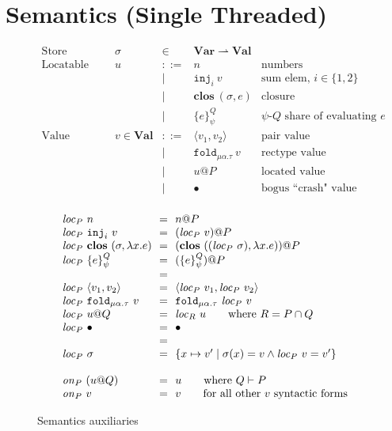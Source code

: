 \documentclass[10pt]{article}
\makeatletter
\newcommand{\kw}[1]{\ensuremath{\mathtt{#1}}}
\newcommand{\trec}[2]{\ensuremath{\mu {#1}.{#2}}}
\newcommand{\einj}[2]{\ensuremath{\kw{inj}_{#1}~{#2}}}
\newcommand{\epair}[2]{\ensuremath{\langle {#1}, {#2} \rangle}}
\newcommand{\elam}[2]{\ensuremath{\lambda {#1}.{#2}}}
\newcommand{\efold}[2]{\ensuremath{\kw{fold}_{#1}~{#2}}}
\newcommand{\vshare}[3]{\ensuremath{\{{#3}\}^{#1}_{#2}}}
\newcommand{\vloc}[2]{\ensuremath{{#1}\kw{@}{#2}}}
\newcommand{\vclos}[2]{\ensuremath{\mathbf{clos}~({#1},{#2})}}
\newcommand{\vcrash}{\ensuremath{\bullet}}
\newcommand{\env}{\ensuremath{\sigma}}
\newcommand{\locof}[2]{\ensuremath{\mathit{loc}_{#1}~{#2}}}
\newcommand{\getat}[2]{\ensuremath{\mathit{on}_{#1}~{#2}}}
\makeatother
\begin{document}
\section{Semantics (Single Threaded)}
\label{sec:STsemantics}

\begin{figure}
  \[\begin{array}{rlcll}
      \text{Store} & \sigma & \in & \mathbf{Var} \rightharpoonup \mathbf{Val}\\
      \text{Locatable value} & u & ::=  & n & \text{numbers} \\
                             && \mid & \einj{i}{v} & \text{sum elem, }i \in \{1,2\}\\
                             && \mid & \vclos{\env}{e}  & \text{closure} \\
                             && \mid & \vshare{Q}{\psi}{e} & \text{$\psi$-$Q$ share of evaluating $e$} \\
      \text{Value} & v  \in \mathbf{Val} & ::=  & \epair{v_1}{v_2} & \text{pair value}\\
                       && \mid & \efold{\trec{\alpha}{\tau}}{v} & \text{rectype value}\\
                   && \mid & \vloc{u}{P} & \text{located value}\\
                   && \mid & \vcrash & \text{bogus ``crash" value}\\
    \end{array}
  \]

\[\begin{array}{l@{~~=~~}l}
    \locof{P}{n} & \vloc{n}{P} \\
    \locof{P}{\einj{i}{v}} & \vloc{(\locof{P}{v})}{P} \\
    \locof{P}{\vclos{\env}{\elam{x}{e}}} & \vloc{(\vclos{(\locof{P}{\env})}{\elam{x}{e}})}{P}\\
    \locof{P}{\vshare{Q}{\psi}{e}} & \vloc{(\vshare{Q}{\psi}{e})}{P}
    \\ \\
    \locof{P}{\epair{v_1}{v_2}} & \epair{\locof{P}{v_1}}{\locof{P}{v_2}}\\
    \locof{P}{ \efold{\trec{\alpha}{\tau}}{v}} &  \efold{\trec{\alpha}{\tau}}{\locof{P}{v}}\\
    \locof{P}{\vloc{u}{Q}} & \locof{R}{u} \qquad\text{where }R = P \cap Q\\
    \locof{P}{\vcrash} & \vcrash
    \\ \\
    \locof{P}{\sigma} & \{ x \mapsto v' \mid \sigma(x) = v \land \locof{P}{v} = v' \}\\
    \multicolumn{2}{c}{}\\
    \getat{P}{(\vloc{u}{Q})} & u \qquad \text{where }Q \vdash P\\
    \getat{P}{v} & v \qquad \text{for all other $v$ syntactic forms}\\
  \end{array}
\]
\caption{Semantics auxiliaries}
\label{fig:auxsem}
\end{figure}
\end{document}
